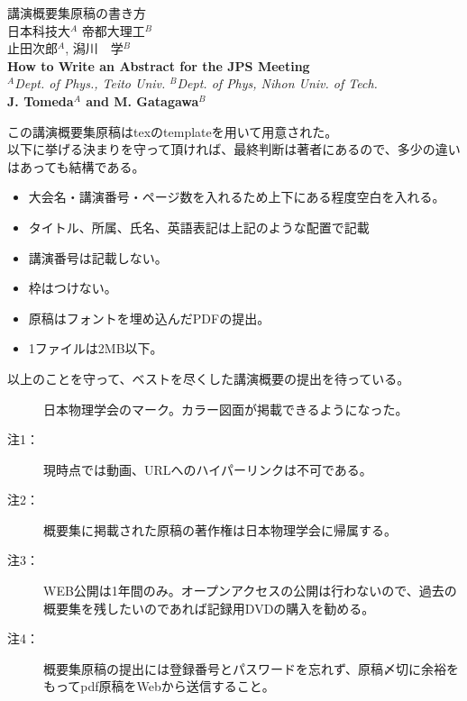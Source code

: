 \documentclass[12pt,a4paper]{jsarticle}
\begin{document}
\vspace{-5pt}
\begin{center}
{\gt \Large 講演概要集原稿の書き方 }\\[14pt]

{\gt \large 日本科技大$^A$ 帝都大理工$^B$ \\ 止田次郎$^A$, 潟川　学$^B$}\\[5pt]

{\large \bf How to Write an Abstract for the JPS Meeting}\\[5pt]

{\large \it $^A$Dept. of Phys., Teito Univ. $^B$Dept. of Phys, Nihon Univ. of Tech.}\\

{\large \bf J. Tomeda$^A$ and M. Gatagawa$^B$}
\end{center}

\vspace{10pt}

この講演概要集原稿はtexのtemplateを用いて用意された。\\
以下に挙げる決まりを守って頂ければ、最終判断は著者にあるので、多少の違いはあっても結構である。

\begin{itemize}
\item 大会名・講演番号・ページ数を入れるため上下にある程度空白を入れる。
\item タイトル、所属、氏名、英語表記は上記のような配置で記載
\item 講演番号は記載しない。
\item 枠はつけない。
\item 原稿はフォントを埋め込んだPDFの提出。
\item 1ファイルは2MB以下。
\end{itemize}

以上のことを守って、ベストを尽くした講演概要の提出を待っている。


\begin{figure}[h]
\begin{center}
\end{center}
\caption{日本物理学会のマーク。カラー図面が掲載できるようになった。 }
\end{figure}


\begin{description}
\item[注1：] 現時点では動画、URLへのハイパーリンクは不可である。
\item[注2：] 概要集に掲載された原稿の著作権は日本物理学会に帰属する。
\item[注3：] WEB公開は1年間のみ。オープンアクセスの公開は行わないので、過去の概要集を残したいのであれば記録用DVDの購入を勧める。
\item[注4：] 概要集原稿の提出には登録番号とパスワードを忘れず、原稿〆切に余裕をもってpdf原稿をWebから送信すること。
\end{description}
\end{document}

